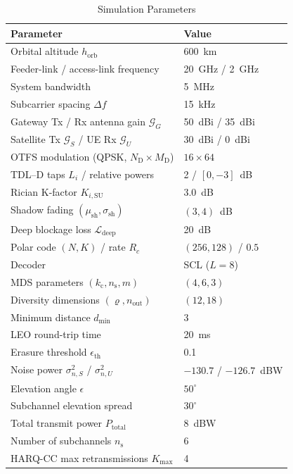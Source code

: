 \documentclass[journal]{IEEEtran}
\begin{document}
\begin{table}[t]
\centering
\caption{Simulation Parameters}
\label{tab:sim_params}
\begin{tabular}{@{}ll@{}}
\toprule
\textbf{Parameter} & \textbf{Value} \\
\midrule
Orbital altitude $h_{\mathrm{orb}}$ & 600~km \\
Feeder-link / access-link frequency & 20~GHz / 2~GHz \\
System bandwidth & 5~MHz \\
Subcarrier spacing $\Delta f$ & 15~kHz \\
Gateway Tx / Rx antenna gain $\mathcal{G}_G$ & 50~dBi / 35~dBi \\
Satellite Tx $\mathcal{G}_S$ / UE Rx $\mathcal{G}_U$ & 30~dBi / 0~dBi \\
OTFS modulation (QPSK, $N_{\mathrm{D}} \times M_{\mathrm{D}}$) & $16 \times 64$ \\
TDL--D taps $L_i$ / relative powers & 2 / $[0, -3]$~dB \\
Rician K-factor $K_{i,\mathrm{SU}}$ & 3.0~dB \\
Shadow fading $(\mu_{\mathrm{sh}}, \sigma_{\mathrm{sh}})$ & $(3, 4)$~dB \\
Deep blockage loss $\mathcal{L}_{\mathrm{deep}}$ & 20~dB \\
Polar code $(N, K)$ / rate $R_c$ & $(256, 128)$ / $0.5$ \\
Decoder & SCL ($L = 8$) \\
MDS parameters $(k_{\mathrm{c}}, n_{\mathrm{s}}, m)$ & $(4, 6, 3)$ \\
Diversity dimensions $(\varrho, n_{\text{out}})$ & $(12, 18)$ \\
Minimum distance $d_{\min}$ & 3 \\
LEO round-trip time  & 20~ms \\
Erasure threshold $\epsilon_{\mathrm{th}}$ & 0.1 \\
Noise power $\sigma_{n,S}^2$ / $\sigma_{n,U}^2$ & $-130.7$ / $-126.7$~dBW \\
Elevation angle $\epsilon$ & $50^{\circ}$ \\
Subchannel elevation spread & $30^{\circ}$ \\
Total transmit power $P_{\mathrm{total}}$ & 8~dBW \\
Number of subchannels $n_{\mathrm{s}}$ & 6 \\
HARQ-CC max retransmissions $K_{\max}$ & 4 \\
\bottomrule
\end{tabular}
\end{table}
\end{document}
